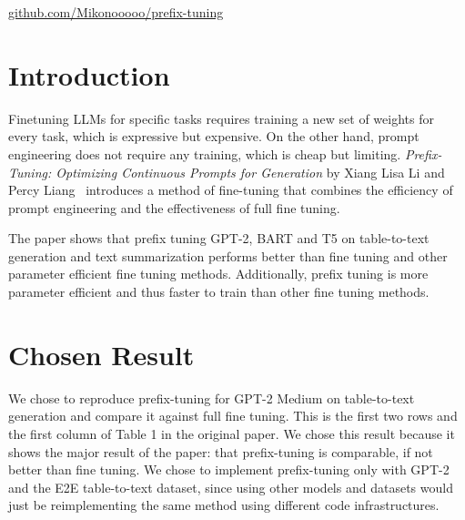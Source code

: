 \documentclass[11pt]{article} %
\author{Mac Turner, Michael Ngo, Eric Hu, Neeraj Parihar}
\begin{document}
\maketitle
\begin{center}
    \vspace{-2em}
    \href{https://github.com/Mikonooooo/prefix-tuning}{github.com/Mikonooooo/prefix-tuning}
\end{center}

\section{Introduction}
Finetuning LLMs for specific tasks requires training a new set of weights for every task, which is expressive but expensive. On the other hand, prompt engineering does not require any training, which is cheap but limiting. \textit{Prefix-Tuning: Optimizing Continuous Prompts for Generation} by Xiang Lisa Li and Percy Liang~\cite{li-liang-2021-prefix} introduces a method of fine-tuning that combines the efficiency of prompt engineering and the effectiveness of full fine tuning.

The paper shows that prefix tuning GPT-2, BART and T5 on table-to-text generation and text summarization performs better than fine tuning and other parameter efficient fine tuning methods. Additionally, prefix tuning is more parameter efficient and thus faster to train than other fine tuning methods.

\section{Chosen Result}

We chose to reproduce prefix-tuning for GPT-2 Medium on table-to-text generation and compare it against full fine tuning. This is the first two rows and the first column of Table 1 in the original paper. We chose this result because it shows the major result of the paper: that prefix-tuning is comparable, if not better than fine tuning. We chose to implement prefix-tuning only with GPT-2 and the E2E table-to-text dataset, since using other models and datasets would just be reimplementing the same method using different code infrastructures. 


\end{document}
